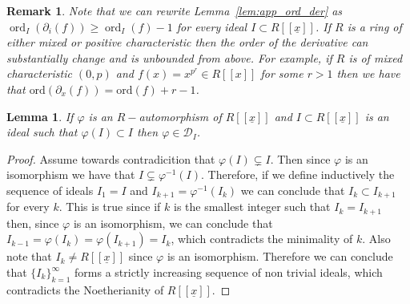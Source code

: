\documentclass{article}
\newtheorem{lemma}[theorem]{Lemma}
\newtheorem{remark}[theorem]{Remark}
\DeclareMathOperator{\ord}{ord}
\numberwithin{theorem}{section}
\begin{document}
\begin{remark}
 \textup{Note that we can rewrite Lemma~\ref{lem:app_ord_der} as $\ord_I(\partial_i(f)) \geq \ord_I(f)-1$ for every ideal $I \subset R[[\underline{x}]]$. If $R$ is a ring of either mixed or positive characteristic then the order of the derivative can substantially change and is unbounded from above. For example, if $R$ is of mixed characteristic $(0,p)$ and $f(x) = x^{p^r} \in R[[x]]$ for some $r>1$ then we have that $\text{ord}(\partial_x(f))=\text{ord}(f)+r-1$. }
\end{remark} 

\begin{lemma}\label{lem:D_I_preserves}
    If $\varphi$ is an $R-$automorphism of $R[[\underline{x}]]$ and $I \subset R[[\underline{x}]]$ is an ideal such that $\varphi(I) \subset I$ then $\varphi \in \mathcal{D}_I$. 
\end{lemma}

\begin{proof}

    Assume towards contradicition that $\varphi(I) \subsetneq I$. Then since $\varphi$ is an isomorphism we have that $I \subsetneq \varphi^{-1}(I)$. Therefore, if we define inductively the sequence of ideals $I_1=I$ and $I_{k+1} = \varphi^{-1}(I_k)$ we can conclude that $I_k \subset I_{k+1}$ for every $k$. This is true since if $k$ is the smallest integer such that $I_{k}=I_{k+1}$ then, since $\varphi$ is an isomorphism, we can conclude that $I_{k-1}=\varphi(I_{k})=\varphi(I_{k+1})=I_k$, which contradicts the minimality of $k$. Also note that $I_k \neq R[[\underline{x}]]$ since $\varphi$ is an isomorphism.  Therefore we can conclude that $\{I_k\}_{k=1}^\infty$ forms a strictly increasing sequence of non trivial ideals, which contradicts the Noetherianity of $R[[\underline{x}]]$.  
\end{proof}

\end{document}
